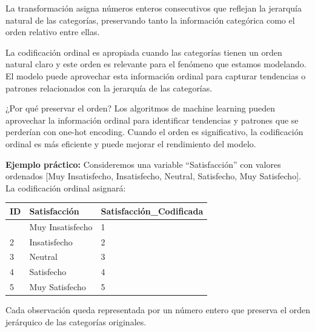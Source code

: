 \documentclass[
  letterpaper,
  DIV=11,
  numbers=noendperiod]{scrreprt}
\begin{document}
La transformación asigna números enteros consecutivos que reflejan la
jerarquía natural de las categorías, preservando tanto la información
categórica como el orden relativo entre ellas.

\begin{tcolorbox}[enhanced jigsaw, breakable, toprule=.15mm, bottomtitle=1mm, coltitle=black, colbacktitle=quarto-callout-warning-color!10!white, titlerule=0mm, opacitybacktitle=0.6, bottomrule=.15mm, toptitle=1mm, title=\textcolor{quarto-callout-warning-color}{\faExclamationTriangle}\hspace{0.5em}{Cuándo usar codificación ordinal}, arc=.35mm, rightrule=.15mm, opacityback=0, colframe=quarto-callout-warning-color-frame, leftrule=.75mm, left=2mm, colback=white]

La codificación ordinal es apropiada cuando las categorías tienen un
orden natural claro y este orden es relevante para el fenómeno que
estamos modelando. El modelo puede aprovechar esta información ordinal
para capturar tendencias o patrones relacionados con la jerarquía de las
categorías.

\end{tcolorbox}

¿Por qué preservar el orden? Los algoritmos de machine learning pueden
aprovechar la información ordinal para identificar tendencias y patrones
que se perderían con one-hot encoding. Cuando el orden es significativo,
la codificación ordinal es más eficiente y puede mejorar el rendimiento
del modelo.

\textbf{Ejemplo práctico:} Consideremos una variable ``Satisfacción''
con valores ordenados {[}Muy Insatisfecho, Insatisfecho, Neutral,
Satisfecho, Muy Satisfecho{]}. La codificación ordinal asignará:

\begin{longtable}[]{@{}lll@{}}
\toprule\noalign{}
\textbf{ID} & \textbf{Satisfacción} &
\textbf{Satisfacción\_Codificada} \\
\midrule\noalign{}
\endhead
\bottomrule\noalign{}
\endlastfoot
1 & Muy Insatisfecho & 1 \\
2 & Insatisfecho & 2 \\
3 & Neutral & 3 \\
4 & Satisfecho & 4 \\
5 & Muy Satisfecho & 5 \\
\end{longtable}

Cada observación queda representada por un número entero que preserva el
orden jerárquico de las categorías originales.
\end{document}
